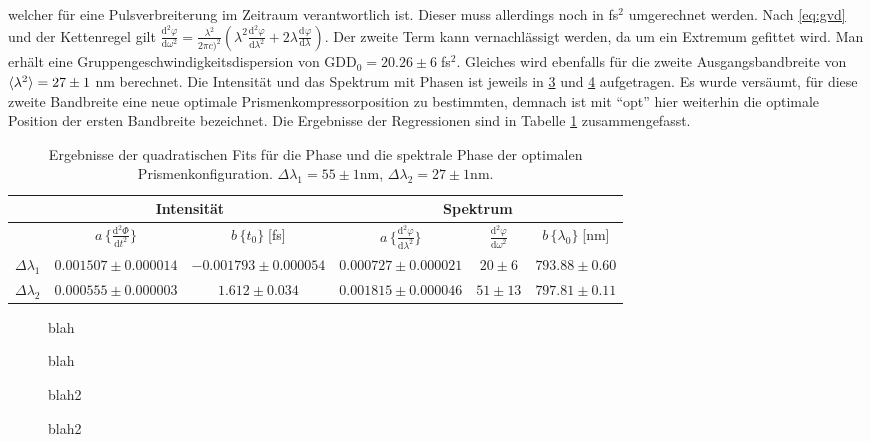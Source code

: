\documentclass[twoside,        %
               BCOR12mm,       %
               english,ngerman, %
               fleqn,headsepline=false,footsepline=false
              ]{Vorlage/MFPREPORT}
\renewcommand{\d}{\ensuremath{\mathrm{d}}} %
\newcommand{\diff}[3][]{\ensuremath{\frac{\d^{#1}#2}{\d#3^{#1}}}} %
\begin{document}
welcher für eine Pulsverbreiterung im Zeitraum verantwortlich ist.
Dieser muss allerdings noch in fs$^2$ umgerechnet werden. Nach \cref{eq:gvd}
und der Kettenregel gilt $\diff[2]{\varphi}{\omega}=\frac{\lambda^2}{2\pi c)^2}\left(
\lambda^2\diff[2]{\varphi}{\lambda}+2\lambda\diff{\varphi}{\lambda} \right)$.
Der zweite Term kann vernachlässigt werden, da um ein Extremum gefittet wird. Man
erhält eine Gruppengeschwindigkeitsdispersion von GDD$_0=20.26\pm6\;$fs$^2$.
Gleiches wird ebenfalls für die zweite Ausgangsbandbreite von
$\braket{\lambda^2}=27\pm1\;$nm berechnet. Die Intensität und das Spektrum mit Phasen
ist jeweils in \cref{fig:temp2} und \cref{fig:spec2} aufgetragen. Es wurde
versäumt, für diese zweite Bandbreite eine neue optimale
Prismenkompressorposition zu bestimmten, demnach ist mit ``opt'' hier weiterhin
die optimale Position der ersten Bandbreite bezeichnet.
Die Ergebnisse der Regressionen sind in Tabelle \cref{tab:fits}
zusammengefasst.

\begin{table}
    \centering
    \begin{tabular}[]{||c|c|c||c|c|c||}
        \hline
        &\multicolumn{2}{|c||}{Intensität}&\multicolumn{3}{|c||}{Spektrum}\\\hline\hline
        &$a\,\{\diff[2]{\Phi}{t}\}$\;[fs$^{-2}$]&$b\, \{t_0\}\;$[fs]&$a\,\{\diff[2]{\varphi}{\lambda}\}$\;[nm$^{-2}$]&$\diff[2]{\varphi}{\omega}$\;[fs$^{-2}$]&$b\, \{\lambda_0\}\;$[nm]\\\hline
       $\Delta\lambda_1$&$0.001507\pm0.000014$&$-0.001793\pm0.000054$&$0.000727\pm0.000021$&$20\pm6$&$793.88\pm0.60$\\\hline
       $\Delta\lambda_2$&$0.000555\pm0.000003$&$1.612\pm0.034$&$0.001815\pm0.000046$&$51\pm13$&$797.81\pm0.11$\\\hline
    \end{tabular}
    \caption{Ergebnisse der quadratischen Fits für die Phase und die
    spektrale Phase der optimalen Prismenkonfiguration.
    $\Delta\lambda_1=55\pm1$\;nm, $\Delta\lambda_2=27\pm1$\;nm.}
    \label{tab:fits}
\end{table}



\begin{figure}[]
    \centering
    
    \caption{blah}
    \label{fig:temp1}
\end{figure}
\begin{figure}[]
    \centering
    
    \caption{blah}
    \label{fig:spec1}
\end{figure}
\begin{figure}[]
    \centering
    
    \caption{blah2}
    \label{fig:temp2}
\end{figure}
\begin{figure}[]
    \centering
    
    \caption{blah2}
    \label{fig:spec2}
\end{figure}
\end{document}
